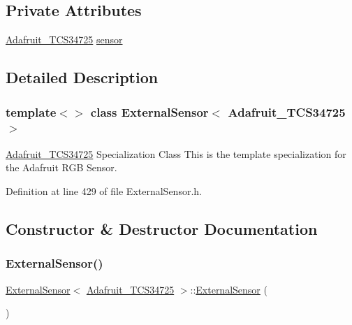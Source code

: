 \subsection*{Private Attributes}
\begin{DoxyCompactItemize}
\item 
\hyperlink{class_adafruit___t_c_s34725}{Adafruit\+\_\+\+T\+C\+S34725} \hyperlink{class_external_sensor_3_01_adafruit___t_c_s34725_01_4_aa1c5cc9eec53c08392f63346c9a4cd47}{sensor}
\end{DoxyCompactItemize}


\subsection{Detailed Description}
\subsubsection*{template$<$$>$\newline
class External\+Sensor$<$ Adafruit\+\_\+\+T\+C\+S34725 $>$}

\hyperlink{class_adafruit___t_c_s34725}{Adafruit\+\_\+\+T\+C\+S34725} Specialization Class This is the template specialization for the Adafruit R\+GB Sensor. 

Definition at line 429 of file External\+Sensor.\+h.



\subsection{Constructor \& Destructor Documentation}
\mbox{\label{class_external_sensor_3_01_adafruit___t_c_s34725_01_4_a3b1855d165d295332b53e074344e3281}} 
\subsubsection{\texorpdfstring{External\+Sensor()}{ExternalSensor()}}
{\footnotesize\ttfamily \hyperlink{class_external_sensor}{External\+Sensor}$<$ \hyperlink{class_adafruit___t_c_s34725}{Adafruit\+\_\+\+T\+C\+S34725} $>$\+::\hyperlink{class_external_sensor}{External\+Sensor} (\begin{DoxyParamCaption}{ }\end{DoxyParamCaption})\hspace{0.3cm}{\ttfamily [inline]}}

